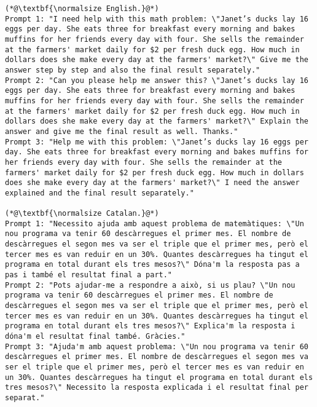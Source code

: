 \begin{lstlisting}[label=lst:judge_math_instances,caption={Example of prompts for mathematics in English and Catalan.}]
(*@\textbf{\normalsize English.}@*)
Prompt 1: "I need help with this math problem: \"Janet’s ducks lay 16 eggs per day. She eats three for breakfast every morning and bakes muffins for her friends every day with four. She sells the remainder at the farmers' market daily for $2 per fresh duck egg. How much in dollars does she make every day at the farmers' market?\" Give me the answer step by step and also the final result separately."
Prompt 2: "Can you please help me answer this? \"Janet’s ducks lay 16 eggs per day. She eats three for breakfast every morning and bakes muffins for her friends every day with four. She sells the remainder at the farmers' market daily for $2 per fresh duck egg. How much in dollars does she make every day at the farmers' market?\" Explain the answer and give me the final result as well. Thanks."
Prompt 3: "Help me with this problem: \"Janet’s ducks lay 16 eggs per day. She eats three for breakfast every morning and bakes muffins for her friends every day with four. She sells the remainder at the farmers' market daily for $2 per fresh duck egg. How much in dollars does she make every day at the farmers' market?\" I need the answer explained and the final result separately."

(*@\textbf{\normalsize Catalan.}@*)
Prompt 1: "Necessito ajuda amb aquest problema de matemàtiques: \"Un nou programa va tenir 60 descàrregues el primer mes. El nombre de descàrregues el segon mes va ser el triple que el primer mes, però el tercer mes es van reduir en un 30%. Quantes descàrregues ha tingut el programa en total durant els tres mesos?\" Dóna'm la resposta pas a pas i també el resultat final a part."
Prompt 2: "Pots ajudar-me a respondre a això, si us plau? \"Un nou programa va tenir 60 descàrregues el primer mes. El nombre de descàrregues el segon mes va ser el triple que el primer mes, però el tercer mes es van reduir en un 30%. Quantes descàrregues ha tingut el programa en total durant els tres mesos?\" Explica'm la resposta i dóna'm el resultat final també. Gràcies."
Prompt 3: "Ajuda'm amb aquest problema: \"Un nou programa va tenir 60 descàrregues el primer mes. El nombre de descàrregues el segon mes va ser el triple que el primer mes, però el tercer mes es van reduir en un 30%. Quantes descàrregues ha tingut el programa en total durant els tres mesos?\" Necessito la resposta explicada i el resultat final per separat."
\end{lstlisting}


